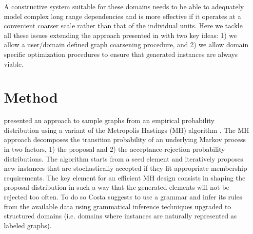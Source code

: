 \documentclass{article}
\begin{document}
A constructive system suitable for these domains needs to be able to
adequately model complex long range dependencies and is more effective if it
operates at a convenient coarser scale rather than that of the individual
units. Here we tackle all these issues extending the approach presented in
\cite{costa16} with two key ideas: 1) we allow a user/domain defined graph
coarsening procedure, and 2) we allow domain specific optimization procedures
to ensure that generated instances are always viable.


\section{Method}

\cite{costa16} presented an approach to sample graphs from an empirical
probability distribution using a variant of the Metropolis Hastings (MH)
algorithm \citep{metropolis1953equation}. The MH approach decomposes the
transition probability of an underlying  Markov process in two factors, 1) the
proposal  and 2) the acceptance-rejection probability distributions. The
algorithm starts from a seed element and iteratively proposes new instances
that are stochastically accepted if they fit appropriate membership
requirements. The key element for an efficient MH design consists in shaping
the proposal distribution  in such a way that the generated elements will not
be rejected too often. To do so Costa suggests to use a grammar and infer its
rules from the available data using grammatical inference techniques upgraded
to structured domains (i.e. domains where instances are naturally represented
as labeled graphs).
\end{document}
